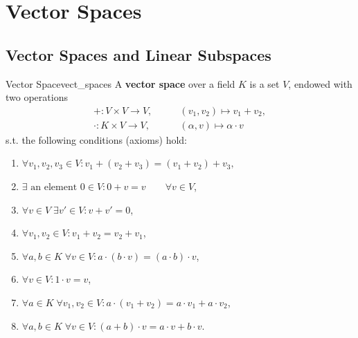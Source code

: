 % 
%
%
%

\section{Vector Spaces}

\subsection{Vector Spaces and Linear Subspaces}
\begin{definition}{Vector Space}{vect_spaces}
	A \textbf{vector space} over a field $K$ is a set $V$, endowed with two operations
	\begin{align*}
		+ : V \times V \to V,& \qquad (v_1, v_2) \mapsto v_1 + v_2,\\
		\cdot : K \times V \to V,& \qquad (\alpha, v) \mapsto \alpha \cdot v
	\end{align*}
	s.t. the following conditions (axioms) hold:
	\begin{enumerate}
		\item[(V1)] $\forall v_1, v_2, v_3 \in V: v_1 + (v_2 + v_3) = (v_1 + v_2) + v_3,$
		\item[(V2)] $\exists \text{ an element } 0 \in V : 0 + v = v \qquad \forall v \in V$,
		\item[(V3)] $\forall v \in V \; \exists v' \in V : v + v' = 0$,
		\item[(V4)] $\forall v_1, v_2 \in V : v_1 + v_2 = v_2 + v_1$,
		\item[(V5)] $\forall a,b \in K\; \forall  v \in V : a \cdot (b \cdot v) = (a\cdot b) \cdot v$,
		\item[(V6)] $\forall v \in V : 1 \cdot v = v$,
		\item[(V7)] $\forall a \in K \; \forall v_1,v_2 \in V : a \cdot (v_1 + v_2) = a\cdot v_1 + a\cdot v_2$,
		\item[(V8)] $\forall a,b \in K \; \forall v \in V : (a + b)\cdot v = a\cdot v + b \cdot v$.
	\end{enumerate}
\end{definition}

